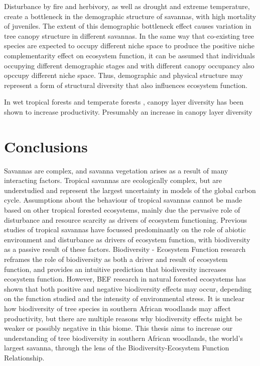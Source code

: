 \begin{refsection}
Disturbance by fire and herbivory, as well as drought and extreme temperature, create a bottleneck in the demographic structure of savannas, with high mortality of juveniles. The extent of this demographic bottleneck effect causes variation in tree canopy structure in different savannas. In the same way that co-existing tree species are expected to occupy different niche space to produce the positive niche complementarity effect on ecosystem function, it can be assumed that individuals occupying different demographic stages and with different canopy occupancy also opccupy different niche space. Thus, demographic and physical structure may represent a form of structural diversity that also influences ecosystem function.

In wet tropical forests \citep{} and temperate forests \citep{Danescu2016}, canopy layer diversity has been shown to increase productivity. Presumably an increase in canopy layer diversity 

\section{Conclusions}
\label{background:sec:conclusion}

Savannas are complex, and savanna vegetation arises as a result of many interacting factors. Tropical savannas are ecologically complex, but are understudied and represent the largest uncertainty in models of the global carbon cycle. Assumptions about the behaviour of tropical savannas cannot be made based on other tropical forested ecosystems, mainly due the pervasive role of disturbance and resource scarcity as drivers of ecosystem functioning. Previous studies of tropical savannas have focussed predominantly on the role of abiotic environment and disturbance as drivers of ecosystem function, with biodiversity as a passive result of these factors. Biodiversity - Ecosystem Function research reframes the role of biodiversity as both a driver and result of ecosystem function, and provides an intuitive prediction that biodiversity increases ecosystem function. However, BEF research in natural forested ecosystems has shown that both positive and negative biodiversity effects may occur, depending on the function studied and the intensity of environmental stress. It is unclear how biodiversity of tree species in southern African woodlands may affect productivity, but there are multiple reasons why biodiversity effects might be weaker or possibly negative in this biome. This thesis aims to increase our understanding of tree biodiversity in southern African woodlands, the world's largest savanna, through the lens of the Biodiversity-Ecosystem Function Relationship.

\newpage{}
\begingroup
{}
\printbibliography[heading=subbibintoc]
\endgroup

\end{refsection}

